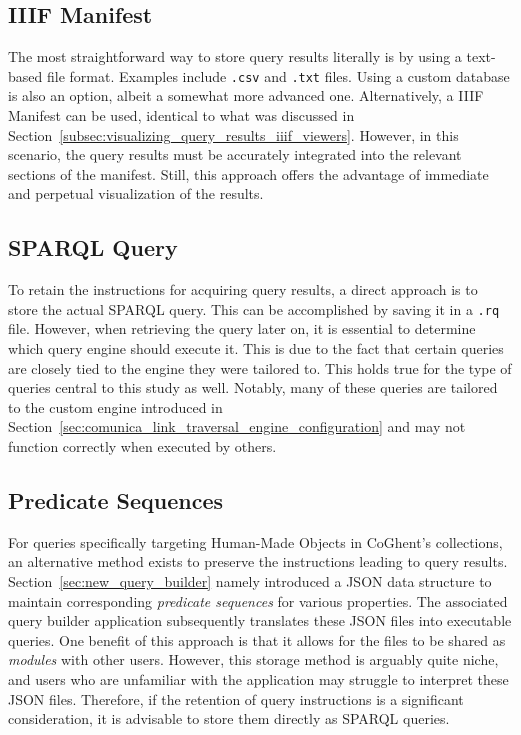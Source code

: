 \subsection{IIIF Manifest}
\label{subsec:saving_query_results_manifest}

The most straightforward way to store query results literally is by using a text-based file format. Examples include \texttt{.csv} and \texttt{.txt} files. Using a custom database is also an option, albeit a somewhat more advanced one. Alternatively, a IIIF Manifest can be used, identical to what was discussed in Section~\ref{subsec:visualizing_query_results_iiif_viewers}. However, in this scenario, the query results must be accurately integrated into the relevant sections of the manifest. Still, this approach offers the advantage of immediate and perpetual visualization of the results.

\subsection{SPARQL Query}
\label{subsec:saving_query_results_query}

To retain the instructions for acquiring query results, a direct approach is to store the actual SPARQL query. This can be accomplished by saving it in a \texttt{.rq} file. However, when retrieving the query later on, it is essential to determine which query engine should execute it. This is due to the fact that certain queries are closely tied to the engine they were tailored to. This holds true for the type of queries central to this study as well. Notably, many of these queries are tailored to the custom engine introduced in Section~\ref{sec:comunica_link_traversal_engine_configuration} and may not function correctly when executed by others.

\subsection{Predicate Sequences}
\label{subsec:saving_query_results_predicates}

For queries specifically targeting Human-Made Objects in CoGhent's collections, an alternative method exists to preserve the instructions leading to query results. Section~\ref{sec:new_query_builder} namely introduced a JSON data structure to maintain corresponding \textit{predicate sequences} for various properties. The associated query builder application subsequently translates these JSON files into executable queries. One benefit of this approach is that it allows for the files to be shared as \textit{modules} with other users. However, this storage method is arguably quite niche, and users who are unfamiliar with the application may struggle to interpret these JSON files. Therefore, if the retention of query instructions is a significant consideration, it is advisable to store them directly as SPARQL queries.


